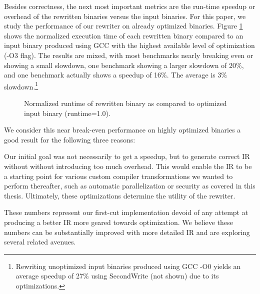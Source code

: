 Besides correctness, the next most important metrics are the run-time
speedup or overhead of the rewritten binaries versus the input
binaries. For this paper, we study the performance of our rewriter on
already optimized binaries. Figure \ref{withopts} shows the normalized
execution time of each rewritten binary compared to an input binary
produced using GCC with the highest available level of optimization
(-O3 flag). The results are mixed, with most benchmarks
nearly breaking even or showing a small slowdown, one benchmark
showing a larger slowdown of 20\%, and one benchmark actually shows a
speedup of 16\%. The average is 3\% slowdown.\footnote{Rewriting unoptimized input binaries produced using GCC -O0 yields an average speedup of 27\% using SecondWrite (not shown) due to its optimizations.}

\begin{figure}[ht!]
\begin{center}
\par\end{center}
\vspace{-.2in}
\caption{Normalized runtime of rewritten binary as compared to optimized input
  binary (runtime=1.0).}
\label{withopts}
\end{figure}

We consider this near break-even performance on highly optimized
binaries a good result for the following three reasons:

\mybeginlist

\item Our initial goal was not necessarily to get a speedup, but to
  generate correct IR without without introducing too much
  overhead. This would enable the IR to be a starting point for
  various custom compiler transformations we wanted to perform
  thereafter, such as automatic parallelization or security as covered
  in this thesis. Ultimately, these optimizations determine the
  utility of the rewriter.

\item These numbers represent our first-cut implementation devoid of
  any attempt at producing a better IR more geared towards
  optimization. We believe these numbers can be substantially improved
  with more detailed IR and are exploring several related avenues.

